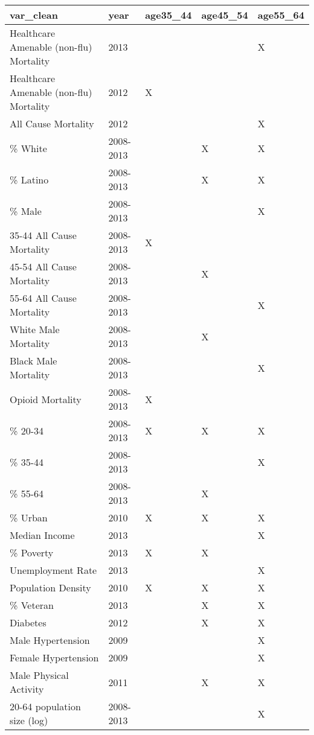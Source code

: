 \begin{table}[ht]
\centering
\begingroup\footnotesize
\begin{tabular}{lllll}
  \hline
var\_clean & year & age35\_44 & age45\_54 & age55\_64 \\ 
  \hline
Healthcare Amenable (non-flu) Mortality & 2013 &  &  & X \\ 
  Healthcare Amenable (non-flu) Mortality & 2012 & X &  &  \\ 
  All Cause Mortality  & 2012 &  &  & X \\ 
  \% White & 2008-2013 &  & X & X \\ 
  \% Latino & 2008-2013 &  & X & X \\ 
  \% Male & 2008-2013 &  &  & X \\ 
  35-44  All Cause Mortality & 2008-2013 & X &  &  \\ 
  45-54  All Cause Mortality & 2008-2013 &  & X &  \\ 
  55-64  All Cause Mortality & 2008-2013 &  &  & X \\ 
  White Male Mortality & 2008-2013 &  & X &  \\ 
  Black Male Mortality & 2008-2013 &  &  & X \\ 
  Opioid Mortality & 2008-2013 & X &  &  \\ 
  \% 20-34 & 2008-2013 & X & X & X \\ 
  \% 35-44 & 2008-2013 &  &  & X \\ 
  \% 55-64 & 2008-2013 &  & X &  \\ 
  \% Urban & 2010 & X & X & X \\ 
  Median Income & 2013 &  &  & X \\ 
  \% Poverty & 2013 & X & X &  \\ 
  Unemployment Rate & 2013 &  &  & X \\ 
  Population Density & 2010 & X & X & X \\ 
  \% Veteran & 2013 &  & X & X \\ 
  Diabetes & 2012 &  & X & X \\ 
  Male Hypertension & 2009 &  &  & X \\ 
  Female Hypertension & 2009 &  &  & X \\ 
  Male Physical Activity & 2011 &  & X & X \\ 
  20-64 population size (log) & 2008-2013 &  &  & X \\ 
   \hline
\end{tabular}
\endgroup
\caption{} 
\end{table}
